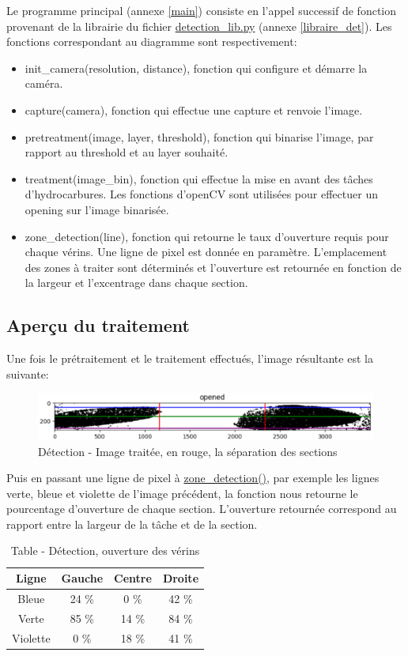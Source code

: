 Le programme principal (annexe \ref{main}) consiste en l'appel successif de fonction provenant de la librairie du fichier \underline{detection\_lib.py} (annexe \ref{libraire_det}).
Les fonctions correspondant au diagramme sont respectivement:
\begin{itemize}
    \item init\_camera(resolution, distance), fonction qui configure et démarre la caméra.
    \item capture(camera), fonction qui effectue une capture et renvoie l'image.
    \item pretreatment(image, layer, threshold), fonction qui binarise l'image, par rapport au threshold et au layer souhaité.
    \item treatment(image\_bin), fonction qui effectue la mise en avant des tâches d'hydrocarbures. Les fonctions d'openCV sont utilisées pour effectuer un opening sur l'image binarisée.
    \item zone\_detection(line), fonction qui retourne le taux d'ouverture requis pour chaque vérins. Une ligne de pixel est donnée en paramètre. L'emplacement des zones à traiter sont déterminés et l'ouverture est retournée en fonction de la largeur et l'excentrage dans chaque section.
\end{itemize}

\subsection{Aperçu du traitement}
Une fois le prétraitement et le traitement effectués, l'image résultante est la suivante:

\begin{figure}[H]
    \centering
    \includegraphics[width=13cm]{assets/figures/traitement1.PNG}
    \caption{Détection - Image traitée, en rouge, la séparation des sections}
\end{figure}

Puis en passant une ligne de pixel à \underline{zone\_detection()}, par exemple les lignes verte, bleue et violette de l'image précédent, la fonction
nous retourne le pourcentage d'ouverture de chaque section. L'ouverture retournée correspond au rapport entre la largeur de la tâche et de la section.

\begin{table}[H]
    \begin{center}
        \caption{Table - Détection, ouverture des vérins}
        \begin{tabular}{|c|c|c|c|}
            Ligne    & Gauche & Centre & Droite \\ \hline
            Bleue    & 24 \%  & 0 \%   & 42 \%  \\
            Verte    & 85 \%  & 14 \%  & 84 \%  \\
            Violette & 0 \%   & 18 \%  & 41 \%  \\
        \end{tabular}
    \end{center}
\end{table}